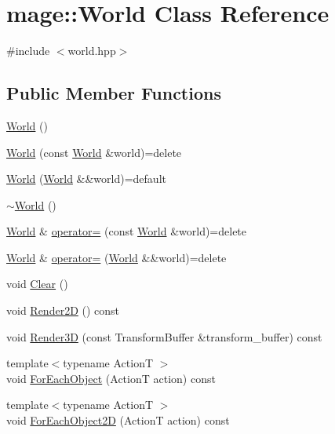 \hypertarget{classmage_1_1_world}{}\section{mage\+:\+:World Class Reference}
\label{classmage_1_1_world}


{\ttfamily \#include $<$world.\+hpp$>$}

\subsection*{Public Member Functions}
\begin{DoxyCompactItemize}
\item 
\hyperlink{classmage_1_1_world_a4b3883a575dcfb8c1f542ecb5938ddc5}{World} ()
\item 
\hyperlink{classmage_1_1_world_a28e20e33499cd57282cefa5ab0fda041}{World} (const \hyperlink{classmage_1_1_world}{World} \&world)=delete
\item 
\hyperlink{classmage_1_1_world_a6170766c5b83465cfdbf847e67315d91}{World} (\hyperlink{classmage_1_1_world}{World} \&\&world)=default
\item 
\hyperlink{classmage_1_1_world_a8f594ba33a69c4142d599e548337bbcf}{$\sim$\+World} ()
\item 
\hyperlink{classmage_1_1_world}{World} \& \hyperlink{classmage_1_1_world_aa7074e3847c9fbe1466aa833f194eed0}{operator=} (const \hyperlink{classmage_1_1_world}{World} \&world)=delete
\item 
\hyperlink{classmage_1_1_world}{World} \& \hyperlink{classmage_1_1_world_a0440e945dfd0291174ce6dc33e5d8335}{operator=} (\hyperlink{classmage_1_1_world}{World} \&\&world)=delete
\item 
void \hyperlink{classmage_1_1_world_a5562299c0c78c7f6cb63b2de77c1fe79}{Clear} ()
\item 
void \hyperlink{classmage_1_1_world_a49e7adf01a415aefc911d69c6fcee665}{Render2D} () const
\item 
void \hyperlink{classmage_1_1_world_a6d5a6fe97bf24c174d9c8f544be34d13}{Render3D} (const Transform\+Buffer \&transform\+\_\+buffer) const
\item 
{\footnotesize template$<$typename ActionT $>$ }\\void \hyperlink{classmage_1_1_world_a9bb9af95395546e334609473dda0854c}{For\+Each\+Object} (ActionT action) const
\item 
{\footnotesize template$<$typename ActionT $>$ }\\void \hyperlink{classmage_1_1_world_ae8293799bc02d12c7a48e248bcc3eb33}{For\+Each\+Object2D} (ActionT action) const

\end{DoxyCompactItemize}
